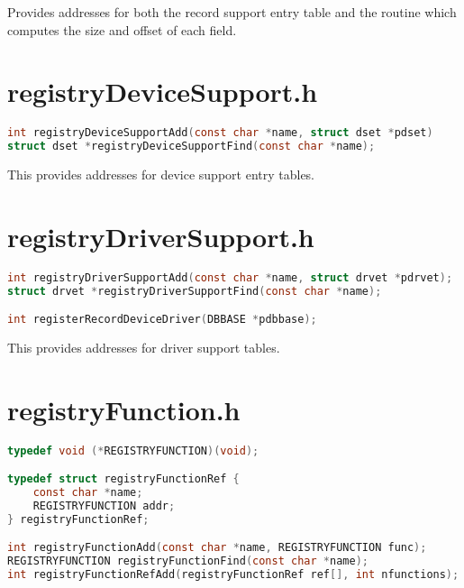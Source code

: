 Provides addresses for both the record support entry table and the routine which computes the size and offset of each 
field.

\section{registryDeviceSupport.h}

\begin{lstlisting}[language=C]
int registryDeviceSupportAdd(const char *name, struct dset *pdset)
struct dset *registryDeviceSupportFind(const char *name);
\end{lstlisting}

This provides addresses for device support entry tables.

\section{registryDriverSupport.h}

\begin{lstlisting}[language=C]
int registryDriverSupportAdd(const char *name, struct drvet *pdrvet);
struct drvet *registryDriverSupportFind(const char *name);

int registerRecordDeviceDriver(DBBASE *pdbbase);
\end{lstlisting}

This provides addresses for driver support tables.

\section{registryFunction.h}

\begin{lstlisting}[language=C]
typedef void (*REGISTRYFUNCTION)(void);

typedef struct registryFunctionRef {
    const char *name;
    REGISTRYFUNCTION addr;
} registryFunctionRef;

int registryFunctionAdd(const char *name, REGISTRYFUNCTION func);
REGISTRYFUNCTION registryFunctionFind(const char *name);
int registryFunctionRefAdd(registryFunctionRef ref[], int nfunctions);
\end{lstlisting}

